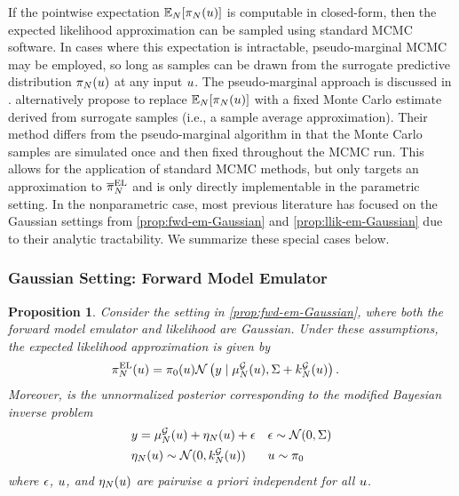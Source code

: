 \documentclass[12pt]{article}
\newtheorem{prop}{Proposition}
\begin{document}
 If the pointwise expectation 
 $\E_{\Ndesign}[\postEm[\Ndesign](\Par)]$ is computable in closed-form, then 
the expected likelihood approximation can be sampled using standard MCMC software.
In cases where this expectation is intractable, pseudo-marginal MCMC 
\citep{pseudoMarginalMCMC} may be employed, so long as 
samples can be drawn from the surrogate predictive distribution $\postEm[\Ndesign](\Par)$
at any input $\Par$. The pseudo-marginal approach is discussed in .
\citet{BurknerSurrogate} alternatively propose to replace  $\E_{\Ndesign}[\postEm[\Ndesign](\Par)]$
with a fixed Monte Carlo estimate derived from surrogate samples (i.e., a sample average approximation). 
Their method differs from the 
pseudo-marginal algorithm in that the Monte Carlo samples are simulated once 
and then fixed throughout the MCMC run. This allows for the application of standard 
MCMC methods, but only targets an approximation to $\postApproxNormMarg[\Ndesign]$
and is only directly implementable in the parametric setting.
In the nonparametric case, most previous literature 
has focused on the Gaussian settings from \cref{prop:fwd-em-Gaussian} and \cref{prop:llik-em-Gaussian}
due to their analytic tractability. We summarize these special cases below.

\subsubsection{Gaussian Setting: Forward Model Emulator}
\begin{prop} \label{prop:post-approx-fwd-EL-Gaussian}
Consider the setting in \cref{prop:fwd-em-Gaussian}, where both the forward model emulator 
and likelihood are Gaussian. Under these assumptions, the expected likelihood approximation
is given by
\begin{align}
\postApproxMarg[\Ndesign](\Par) 
&= \priorDens(\Par) \Gaussian\left(\obs \given \emMean[\Ndesign]{\fwd}(\Par), \likPar + \emKer[\Ndesign]{\fwd}(\Par) \right). \label{eq:post-approx-fwd-EL-Gaussian}
\end{align}
Moreover,  is the unnormalized posterior corresponding to the modified
Bayesian inverse problem
\begin{align}
&\obs = \emMean[\Ndesign]{\fwd}(\Par) + \eta_{\Ndesign}(\Par) + \noise
&&\noise \sim \Gaussian(0, \likPar)  \label{inv_prob_Gaussian_modified} \\
&\eta_{\Ndesign}(\Par) \sim \Gaussian(0, \emKer[\Ndesign]{\fwd}(\Par))
&&\Par \sim \priorDens  \nonumber
\end{align}
where $\noise$, $\Par$, and $\eta_{\Ndesign}(\Par)$ are pairwise a priori independent for all $\Par$.
\end{prop}
\end{document}

